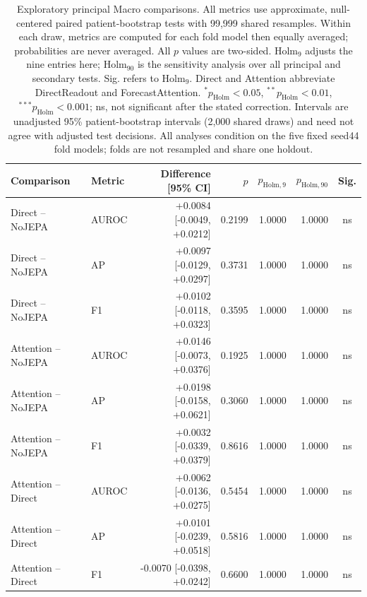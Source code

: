 \begin{table}[t]
\centering
\small
\caption{Exploratory principal Macro comparisons. All metrics use approximate, null-centered paired patient-bootstrap tests with 99,999 shared resamples. Within each draw, metrics are computed for each fold model then equally averaged; probabilities are never averaged. All $p$ values are two-sided. Holm$_9$ adjusts the nine entries here; Holm$_{90}$ is the sensitivity analysis over all principal and secondary tests. Sig. refers to Holm$_9$. Direct and Attention abbreviate DirectReadout and ForecastAttention. $^{*}p_{\mathrm{Holm}}<0.05$, $^{**}p_{\mathrm{Holm}}<0.01$, $^{***}p_{\mathrm{Holm}}<0.001$; ns, not significant after the stated correction. Intervals are unadjusted 95\% patient-bootstrap intervals (2,000 shared draws) and need not agree with adjusted test decisions. All analyses condition on the five fixed seed44 fold models; folds are not resampled and share one holdout.}
\label{tab:bootstrap}
\begin{tabular}{llrrrrc}
\toprule
Comparison & Metric & Difference [95\% CI] & $p$ & $p_{\mathrm{Holm},9}$ & $p_{\mathrm{Holm},90}$ & Sig. \\
\midrule
Direct -- NoJEPA & AUROC & +0.0084 [-0.0049, +0.0212] & 0.2199 & 1.0000 & 1.0000 & ns \\
Direct -- NoJEPA & AP & +0.0097 [-0.0129, +0.0297] & 0.3731 & 1.0000 & 1.0000 & ns \\
Direct -- NoJEPA & F1 & +0.0102 [-0.0118, +0.0323] & 0.3595 & 1.0000 & 1.0000 & ns \\
Attention -- NoJEPA & AUROC & +0.0146 [-0.0073, +0.0376] & 0.1925 & 1.0000 & 1.0000 & ns \\
Attention -- NoJEPA & AP & +0.0198 [-0.0158, +0.0621] & 0.3060 & 1.0000 & 1.0000 & ns \\
Attention -- NoJEPA & F1 & +0.0032 [-0.0339, +0.0379] & 0.8616 & 1.0000 & 1.0000 & ns \\
Attention -- Direct & AUROC & +0.0062 [-0.0136, +0.0275] & 0.5454 & 1.0000 & 1.0000 & ns \\
Attention -- Direct & AP & +0.0101 [-0.0239, +0.0518] & 0.5816 & 1.0000 & 1.0000 & ns \\
Attention -- Direct & F1 & -0.0070 [-0.0398, +0.0242] & 0.6600 & 1.0000 & 1.0000 & ns \\
\bottomrule
\end{tabular}
\end{table}
